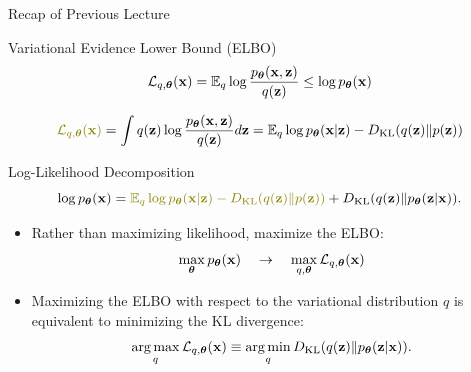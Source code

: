 \documentclass{beamer}
\begin{document}
\begin{frame}{Recap of Previous Lecture}
	\begin{block}{Variational Evidence Lower Bound (ELBO)}
		\vspace{-0.3cm}
		\[
			\mathcal{L}_{q, \boldsymbol{\theta}}(\mathbf{x}) = \mathbb{E}_{q} \log \frac{p_{\boldsymbol{\theta}}(\mathbf{x}, \mathbf{z})}{q(\mathbf{z})}  \leq \log p_{\boldsymbol{\theta}}(\mathbf{x})
		\]
		\vspace{-0.5cm}
	\end{block}

	\vspace{-0.7cm}
	\[
	 	{\color{olive}\cL_{q, \btheta}(\bx)} = \int q(\bz) \log \frac{\pt(\bx, \bz)}{q(\bz)}d\bz = \bbE_{q} \log \pt(\bx | \bz) - \KL (q(\bz) \| p(\bz))
	\]
	\vspace{-0.4cm}
	\begin{block}{Log-Likelihood Decomposition}
		\vspace{-0.5cm}
		\[
	 		\log \pt(\bx) = {\color{olive}\bbE_{q} \log \pt(\bx | \bz) - \KL (q(\bz) \| p(\bz))} + \KL(q(\bz) \| \pt(\bz|\bx)).
		\]
	\end{block}
	\begin{itemize}
		\item Rather than maximizing likelihood, maximize the ELBO:
		\[
			\max_{\boldsymbol{\theta}} p_{\boldsymbol{\theta}}(\mathbf{x}) \quad \rightarrow \quad \max_{q, \boldsymbol{\theta}} \mathcal{L}_{q, \boldsymbol{\theta}}(\mathbf{x})
		\]
		\item Maximizing the ELBO with respect to the variational distribution $q$ is equivalent to minimizing the KL divergence:
		\[
			\operatorname*{arg\,max}_q \mathcal{L}_{q, \boldsymbol{\theta}}(\mathbf{x}) \equiv \operatorname*{arg\,min}_q D_\mathrm{KL}(q(\mathbf{z}) \| p_{\boldsymbol{\theta}}(\mathbf{z}|\mathbf{x})).
		\]
  	\end{itemize}
\end{frame}
\end{document}

